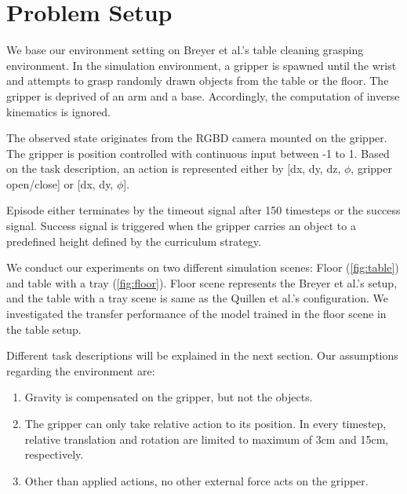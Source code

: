 \section{Problem Setup}

We base our environment setting on Breyer et al.'s table cleaning grasping environment. In the simulation environment, a gripper is spawned until the wrist and attempts to grasp randomly drawn objects from the table or the floor. The gripper is deprived of an arm and a base. Accordingly, the computation of inverse kinematics is ignored.

The observed state originates from the RGBD camera mounted on the gripper. The gripper is position controlled with continuous input between -1 to 1. Based on the task description, an action is represented either by [dx, dy, dz, \(\phi\), gripper open/close] or [dx, dy, \(\phi\)]. 

Episode either terminates by the timeout signal after 150 timesteps or the success signal. Success signal is triggered when the gripper carries an object to a predefined height defined by the curriculum strategy.

We conduct our experiments on two different simulation scenes: Floor (\ref{fig:table}) and table with a tray (\ref{fig:floor}). Floor scene represents the Breyer et al.'s setup, and the table with a tray scene is same as the Quillen et al.'s configuration. We investigated the transfer performance of the model trained in the floor scene in the table setup.

Different task descriptions will be explained in the next section. Our assumptions regarding the environment are:

\begin{enumerate}
    \item Gravity is compensated on the gripper, but not the objects.
    \item The gripper can only take relative action to its position. In every timestep, relative translation and rotation are limited to maximum of 3cm and 15cm, respectively.
    \item Other than applied actions, no other external force acts on the gripper. 
\end{enumerate}

